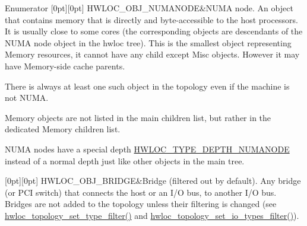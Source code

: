 \begin{DoxyEnumFields}{Enumerator}
[0pt][0pt]{}\mbox{\label{a00184_ggacd37bb612667dc437d66bfb175a8dc55a9d917a3e5497950c6d8948b8e183db5a}} 
H\+W\+L\+O\+C\+\_\+\+O\+B\+J\+\_\+\+N\+U\+M\+A\+N\+O\+DE&N\+U\+MA node. An object that contains memory that is directly and byte-\/accessible to the host processors. It is usually close to some cores (the corresponding objects are descendants of the N\+U\+MA node object in the hwloc tree). This is the smallest object representing Memory resources, it cannot have any child except Misc objects. However it may have Memory-\/side cache parents.

There is always at least one such object in the topology even if the machine is not N\+U\+MA.

Memory objects are not listed in the main children list, but rather in the dedicated Memory children list.

N\+U\+MA nodes have a special depth \hyperlink{a00187_ggaf4e663cf42bbe20756b849c6293ef575a245c34ec9884c2cf5de5049b2153ed9c}{H\+W\+L\+O\+C\+\_\+\+T\+Y\+P\+E\+\_\+\+D\+E\+P\+T\+H\+\_\+\+N\+U\+M\+A\+N\+O\+DE} instead of a normal depth just like other objects in the main tree. \\
\hline

[0pt][0pt]{}\mbox{\label{a00184_ggacd37bb612667dc437d66bfb175a8dc55a6825f10895fea60aca7a6ba9fe273db0}} 
H\+W\+L\+O\+C\+\_\+\+O\+B\+J\+\_\+\+B\+R\+I\+D\+GE&Bridge (filtered out by default). Any bridge (or P\+CI switch) that connects the host or an I/O bus, to another I/O bus. Bridges are not added to the topology unless their filtering is changed (see \hyperlink{a00193_gad894e70f15f8d4aada7be8d1aba38b7e}{hwloc\+\_\+topology\+\_\+set\+\_\+type\+\_\+filter()} and \hyperlink{a00193_ga0ab38705357bc1203abe829da8a12ad3}{hwloc\+\_\+topology\+\_\+set\+\_\+io\+\_\+types\+\_\+filter()}).


\end{DoxyEnumFields}
